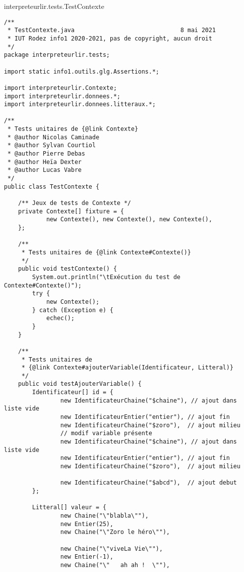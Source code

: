\begin{enum}
    \item interpreteurlir.tests.TestContexte
\begin{verbatim}
/**
 * TestContexte.java                              8 mai 2021
 * IUT Rodez info1 2020-2021, pas de copyright, aucun droit
 */
package interpreteurlir.tests;

import static info1.outils.glg.Assertions.*;

import interpreteurlir.Contexte;
import interpreteurlir.donnees.*;
import interpreteurlir.donnees.litteraux.*;

/**
 * Tests unitaires de {@link Contexte}
 * @author Nicolas Caminade
 * @author Sylvan Courtiol
 * @author Pierre Debas
 * @author Heïa Dexter
 * @author Lucas Vabre
 */
public class TestContexte {

    /** Jeux de tests de Contexte */
    private Contexte[] fixture = { 
            new Contexte(), new Contexte(), new Contexte(),
    };
    
    /**
     * Tests unitaires de {@link Contexte#Contexte()}
     */
    public void testContexte() {
        System.out.println("\tExécution du test de Contexte#Contexte()");
        try {
            new Contexte();  
        } catch (Exception e) {
            echec();
        }
    }
    
    /**
     * Tests unitaires de 
     * {@link Contexte#ajouterVariable(Identificateur, Litteral)}
     */
    public void testAjouterVariable() {
        Identificateur[] id = {
                new IdentificateurChaine("$chaine"), // ajout dans liste vide
                new IdentificateurEntier("entier"), // ajout fin
                new IdentificateurChaine("$zoro"),  // ajout milieu
                // modif variable présente
                new IdentificateurChaine("$chaine"), // ajout dans liste vide
                new IdentificateurEntier("entier"), // ajout fin
                new IdentificateurChaine("$zoro"),  // ajout milieu
                
                new IdentificateurChaine("$abcd"),  // ajout debut
        };
        
        Litteral[] valeur = {
                new Chaine("\"blabla\""),
                new Entier(25),
                new Chaine("\"Zoro le héro\""),
                
                new Chaine("\"viveLa Vie\""),
                new Entier(-1),
                new Chaine("\"   ah ah !  \""),
                

\end{verbatim}
\end{enum}
